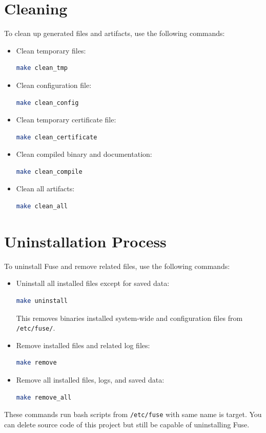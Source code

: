 \documentclass[a4paper,12pt]{article}
\begin{document}
\section*{Cleaning}
To clean up generated files and artifacts, use the following commands:
\begin{itemize}
	\item Clean temporary files:
	      \begin{lstlisting}[language=bash]
make clean_tmp
	      \end{lstlisting}
	\item Clean configuration file:
	      \begin{lstlisting}[language=bash]
make clean_config
	      \end{lstlisting}
	\item Clean temporary certificate file:
	      \begin{lstlisting}[language=bash]
make clean_certificate
	      \end{lstlisting}
	\item Clean compiled binary and documentation:
	      \begin{lstlisting}[language=bash]
make clean_compile
	      \end{lstlisting}
	\item Clean all artifacts:
	      \begin{lstlisting}[language=bash]
make clean_all
	      \end{lstlisting}
\end{itemize}

\section*{Uninstallation Process}
To uninstall Fuse and remove related files, use the following commands:

\begin{itemize}
	\item Uninstall all installed files except for saved data:
	      \begin{lstlisting}[language=bash]
make uninstall
          \end{lstlisting}
	      This removes binaries installed system-wide and configuration files from \texttt{/etc/fuse/}.

	\item Remove installed files and related log files:
	      \begin{lstlisting}[language=bash]
make remove
          \end{lstlisting}
	\item Remove all installed files, logs, and saved data:
	      \begin{lstlisting}[language=bash]
make remove_all
          \end{lstlisting}
\end{itemize}
These commands run bash scripts from \texttt{/etc/fuse} with same name is target. You can delete source code of this project but still be capable of uninstalling Fuse.
\end{document}
